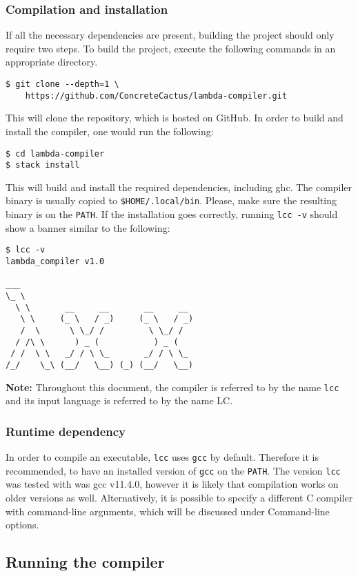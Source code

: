 \documentclass[12pt]{article}
\begin{document}
\subsubsection{Compilation and installation}

If all the necessary dependencies are present, building the project should only
require two steps. To build the project, execute the following commands in an
appropriate directory.
\begin{lstlisting}
$ git clone --depth=1 \
    https://github.com/ConcreteCactus/lambda-compiler.git
\end{lstlisting}
This will clone the repository, which is hosted on GitHub. In order to build and
install the compiler, one would run the following:
\begin{lstlisting}
$ cd lambda-compiler
$ stack install
\end{lstlisting}
This will build and install the required dependencies, including ghc. The
compiler binary is usually copied to \texttt{\$HOME/.local/bin}. Please, make
sure the resulting binary is on the \texttt{PATH}. If the installation goes
correctly, running \texttt{lcc -v} should show a banner similar to the
following:
\begin{lstlisting}
$ lcc -v
lambda_compiler v1.0

___
\_ \
  \ \       __     __       __     __
   \ \     (_ \   / _)     (_ \   / _)
   /  \      \ \_/ /         \ \_/ /
  / /\ \      ) _ (           ) _ (
 / /  \ \   _/ / \ \_       _/ / \ \_
/_/    \_\ (__/   \__) (_) (__/   \__)
\end{lstlisting}
\textbf{Note:} Throughout this document, the compiler is referred to by the name
\texttt{lcc} and its input language is referred to by the name LC.

\subsubsection{Runtime dependency}

In order to compile an executable, \texttt{lcc} uses \texttt{gcc} by default.
Therefore it is recommended, to have an installed version of \texttt{gcc} on the
\texttt{PATH}. The version \texttt{lcc} was tested with was gcc v11.4.0, however
it is likely that compilation works on older versions as well. Alternatively, it
is possible to specify a different C compiler with command-line arguments, which
will be discussed under Command-line options.

\subsection{Running the compiler}
\end{document}
